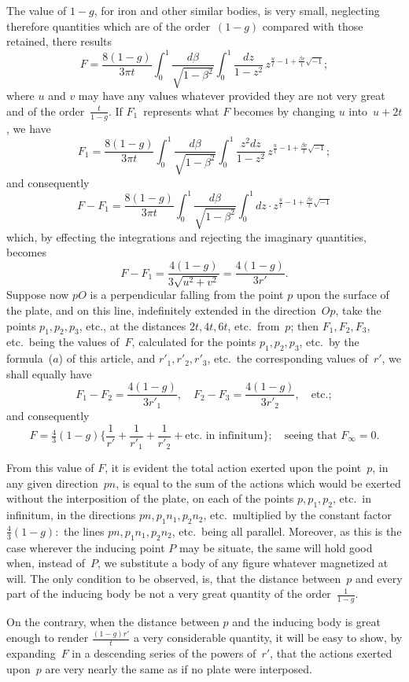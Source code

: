 \documentclass[11pt,notitlepage]{amsart}
\begin{document}
The value of $1-g$, for iron and other similar bodies, is very small,
neglecting therefore quantities which are of the order~$(1-g)$
compared with those
retained, there results
\[
\tag{$a$.}
F=\frac{8(1-g)}{3\pi t}
\int_0^1\frac{d\beta}{\sqrt{1-\beta^2}}
\int_0^1\frac{dz}{1-z^2}\,z^{\frac ut-1+\frac{\beta v}{t}\sqrt{-1}};
\]
where $u$ and $v$ may have any values whatever provided they are not very
great and of the order~$\frac{t}{1-g}$.
If $F_1$~represents what $F$ becomes by changing
$u$ into~$u+2t$, we have
\[
F_1=\frac{8(1-g)}{3\pi t}
\int_0^1\frac{d\beta}{\sqrt{1-\beta^2}}
\int_0^1\frac{z^2dz}{1-z^2}\,z^{\frac ut-1+\frac{\beta v}{t}\sqrt{-1}};
\]
and consequently
\[
F-F_1=\frac{8(1-g)}{3\pi t}
\int_0^1\frac{d\beta}{\sqrt{1-\beta^2}}
\int_0^1dz\cdot z^{\frac ut-1+\frac{\beta v}{t}\sqrt{-1}}
\]
which, by effecting the integrations and rejecting the imaginary quantities,
becomes
\[
F-F_1=\frac{4(1-g)}{3\sqrt{u^2+v^2}}=\frac{4(1-g)}{3r'}.
\]
Suppose now $pO$ is a perpendicular falling from the point $p$ upon the surface
of the plate, and on this line, indefinitely extended in the direction~$Op$,
take
the points $p_1,p_2,p_3$, etc., at the distances $2t,4t,6t$,
etc.\ from~$p$; then
$F_1,F_2,F_3$, etc.\ being the values of~$F$,
calculated for the points $p_1,p_2,p_3$, etc.\ by
the formula~($a$) of this article,
and $r'_1,r'_2,r'_3$, etc.\ the corresponding
values of~$r'$, we shall equally have
\[
F_1-F_2=\frac{4(1-g)}{3r'_1},\quad
F_2-F_3=\frac{4(1-g)}{3r'_2},\quad\text{etc.};
\]
and consequently
\[
F=\tfrac43(1-g)
\biggl\{ \frac{1}{r'}+\frac{1}{r'_1}+\frac{1}{r'_2}
+\text{etc. in infinitum} \biggr\};
\quad\text{seeing that $F_\infty=0$.}
\]

From this value of $F$, it is evident the total action exerted upon the
point~$p$, in any given direction~$pn$, is equal to the sum of the actions which
would be exerted without the interposition of the plate, on each of the points
$p,p_1,p_2$, etc.\ in infinitum,
in the directions $pn,p_1n_1,p_2n_2$, etc.\ multiplied
by the constant factor~$\frac43(1-g):$
the lines $pn,p_1n_1,p_2n_2$, etc.\ being all
parallel. Moreover, as this is the case wherever the inducing point $P$ may
be situate, the same will hold good when, instead of~$P$, we substitute a body
of any figure whatever magnetized at will. The only condition to be observed,
is, that the distance between~$p$ and every part of the inducing body be not
a very great quantity of the order~$\frac{1}{1-g}$.

On the contrary, when the distance between $p$ and the inducing body
is great enough to render $\frac{(1-g)r'}{t}$
a very considerable quantity, it will be
easy to show, by expanding~$F$ in a descending series of the powers of~$r'$,
that the actions exerted upon~$p$ are very nearly the same as if no plate
were interposed.
\end{document}
